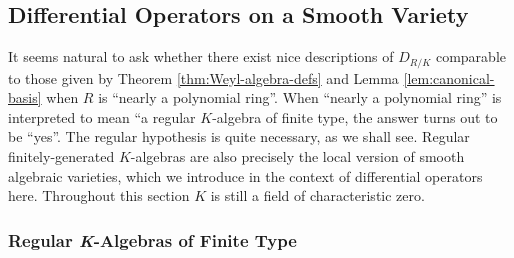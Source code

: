 \subsection{Differential Operators on a Smooth Variety}\label{sec:diff-op-examples}
It seems natural to ask whether there exist nice descriptions of $D_{R/K}$ comparable to those given by Theorem \ref{thm:Weyl-algebra-defs} and Lemma \ref{lem:canonical-basis} when $R$ is ``nearly a polynomial ring''. When ``nearly a polynomial ring'' is interpreted to mean ``a regular $K$-algebra of finite type, the answer turns out to be ``yes''. The regular hypothesis is quite necessary, as we shall see. Regular finitely-generated $K$-algebras are also precisely the local version of smooth algebraic varieties, which we introduce in the context of differential operators here. Throughout this section $K$ is still a field of characteristic zero.
\subsubsection{Regular \textit{K}-Algebras of Finite Type}

